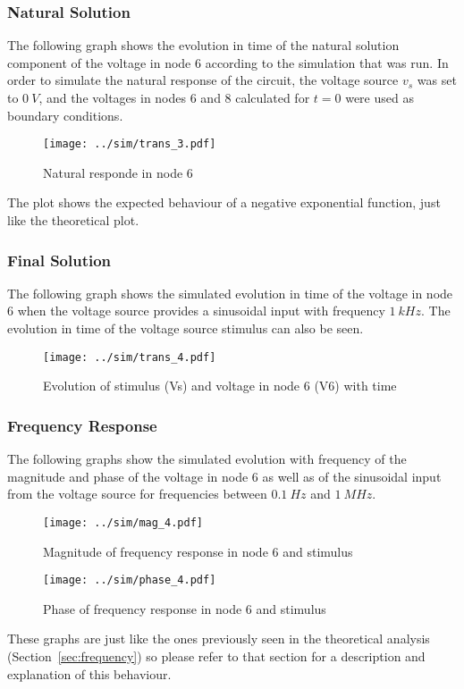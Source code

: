 \subsubsection{Natural Solution}

The following graph shows the evolution in time of the natural solution component of the voltage in node 6 according to the simulation that was run. In order to simulate the natural response of the circuit, the voltage source $v_s$ was set to $0 \ V$, and the voltages in nodes 6 and 8 calculated for $t=0$ were used as boundary conditions.

\begin{figure}[H] \centering
\texttt{[image: ../sim/trans\_3.pdf]}
\caption{Natural responde in node 6}
\label{fig:natural_sim}
\end{figure}

The plot shows the expected behaviour of a negative exponential function, just like the theoretical plot.

\subsubsection{Final Solution}

The following graph shows the simulated evolution in time of the voltage in node 6 when the voltage source provides a sinusoidal input with frequency $1 \ kHz$. The evolution in time of the voltage source stimulus can also be seen.

\begin{figure}[H] \centering
\texttt{[image: ../sim/trans\_4.pdf]}
\caption{Evolution of stimulus (Vs) and voltage in node 6 (V6) with time}
\label{fig:final_sim}
\end{figure}

\subsubsection{Frequency Response}

The following graphs show the simulated evolution with frequency of the magnitude and phase of the voltage in node 6 as well as of the sinusoidal input from the voltage source for frequencies between $0.1 \ Hz$ and $1 \ MHz$.

\begin{figure}[H] \centering
\texttt{[image: ../sim/mag\_4.pdf]}
\caption{Magnitude of frequency response in node 6 and stimulus}
\label{fig:mag_sim}
\end{figure}


\begin{figure}[H] \centering
\texttt{[image: ../sim/phase\_4.pdf]}
\caption{Phase of frequency response in node 6 and stimulus}
\label{fig:phase_sim}
\end{figure}


These graphs are just like the ones previously seen in the theoretical analysis (Section~\ref{sec:frequency}) so please refer to that section for a description and explanation of this behaviour.
